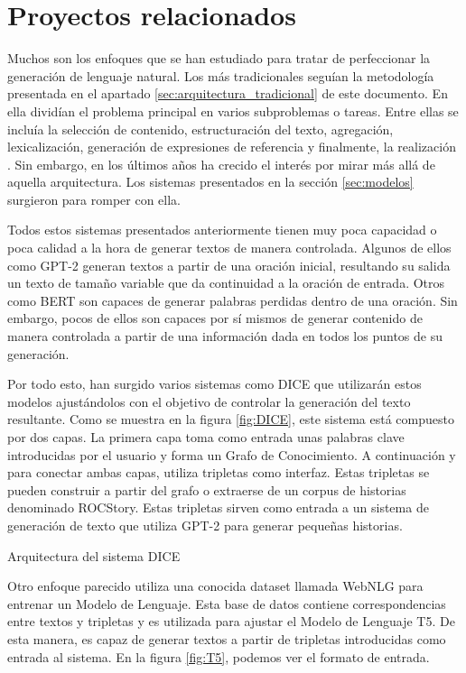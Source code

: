 \section{Proyectos relacionados}
Muchos son los enfoques que se han estudiado para tratar de perfeccionar la generación de lenguaje natural. Los más tradicionales seguían la metodología presentada en el apartado \ref{sec:arquitectura_tradicional} de este documento. En ella dividían el problema principal en varios subproblemas o tareas. Entre ellas se incluía la selección de contenido, estructuración del texto, agregación, lexicalización, generación de expresiones de referencia y finalmente, la realización \citep{reiter1997building}. Sin embargo, en los últimos años ha crecido el interés por mirar más allá de aquella arquitectura. Los sistemas presentados en la sección \ref{sec:modelos} surgieron para romper con ella.

Todos estos sistemas presentados anteriormente tienen muy poca capacidad o poca calidad a la hora de generar textos de manera controlada. Algunos de ellos como GPT-2 generan textos a partir de una oración inicial, resultando su salida un texto de tamaño variable que da continuidad a la oración de entrada. Otros como BERT son capaces de generar palabras perdidas dentro de una oración. Sin embargo, pocos de ellos son capaces por sí mismos de generar contenido de manera controlada a partir de una información dada en todos los puntos de su generación.

 
Por todo esto, han surgido varios sistemas como DICE \citep{yang2020creative} que utilizarán estos modelos ajustándolos con el objetivo de controlar la generación del texto resultante. Como se muestra en la figura \ref{fig:DICE}, este sistema está compuesto por dos capas. La primera capa toma como entrada unas palabras clave introducidas por el usuario y forma un Grafo de Conocimiento. A continuación y para conectar ambas capas, utiliza tripletas como interfaz. Estas tripletas se pueden construir a partir del grafo o extraerse de un corpus de historias denominado ROCStory. Estas tripletas sirven como entrada a un sistema de generación de texto que utiliza GPT-2 para generar pequeñas historias.

%
{Arquitectura del sistema DICE}

Otro enfoque parecido utiliza una conocida dataset llamada WebNLG para entrenar un Modelo de Lenguaje. Esta base de datos contiene correspondencias entre textos y tripletas y es utilizada para ajustar el Modelo de Lenguaje T5. De esta manera, es capaz de generar textos a partir de tripletas introducidas como entrada al sistema. En la figura \ref{fig:T5}, podemos ver el formato de entrada.

